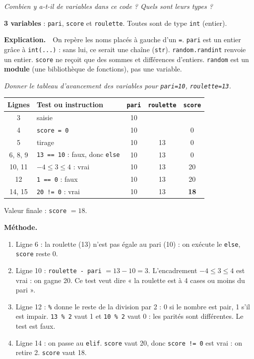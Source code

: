 \documentclass[addpoints, 11pt]{exam}
\newcommand{\enonce}[1]{\textit{#1}\par\smallskip}
\newcommand{\methode}{\par\smallskip\noindent\textbf{Méthode.}\ }
\newcommand{\explication}{\par\smallskip\noindent\textbf{Explication.}\ }
\newcommand{\code}[1]{\texttt{#1}}
\DeclareRobustCommand{\_}{\textunderscore\allowbreak}
\begin{document}
\begin{questions}
\question[1] \enonce{Combien y a-t-il de variables dans ce code ? Quels sont leurs types ?}
\begin{reponse}
\textbf{3 variables} : \code{pari}, \code{score} et \code{roulette}. Toutes sont de type \code{int} (entier).
\end{reponse}
\explication\ On repère les noms placés à gauche d'un \code{=}. \code{pari} est un entier grâce à \code{int(...)} : sans lui, ce serait une chaîne (\code{str}). \code{random.randint} renvoie un entier. \code{score} ne reçoit que des sommes et différences d'entiers. \code{random} est un \textbf{module} (une bibliothèque de fonctions), pas une variable.

\question[3] \enonce{Donner le tableau d'avancement des variables pour \code{pari=10}, \code{roulette=13}.}
\begin{reponse}
\begin{center}
\begin{tabular}{|c|l|c|c|c|}
\hline
Lignes & Test ou instruction & \code{pari} & \code{roulette} & \code{score} \\ \hline
3 & saisie & 10 & & \\
4 & \code{score = 0} & 10 & & 0 \\
5 & tirage & 10 & 13 & 0 \\
6, 8, 9 & \code{13 == 10} : faux, donc \code{else} & 10 & 13 & 0 \\
10, 11 & $-4 \le 3 \le 4$ : vrai & 10 & 13 & 20 \\
12 & \code{1 == 0} : faux & 10 & 13 & 20 \\
14, 15 & \code{20 != 0} : vrai & 10 & 13 & \textbf{18} \\ \hline
\end{tabular}
\end{center}
Valeur finale : \code{score} $= 18$.
\end{reponse}
\methode
\begin{enumerate}
  \item Ligne 6 : la roulette (13) n'est pas égale au pari (10) : on exécute le \code{else}, \code{score} reste 0.
  \item Ligne 10 : \code{roulette - pari} $= 13 - 10 = 3$. L'encadrement $-4 \le 3 \le 4$ est vrai : on gagne 20. Ce test veut dire « la roulette est à 4 cases ou moins du pari ».
  \item Ligne 12 : \code{\%} donne le reste de la division par 2 : 0 si le nombre est pair, 1 s'il est impair. \code{13 \% 2} vaut 1 et \code{10 \% 2} vaut 0 : les parités sont différentes. Le test est faux.
  \item Ligne 14 : on passe au \code{elif}. \code{score} vaut 20, donc \code{score != 0} est vrai : on retire 2. \code{score} vaut 18.
\end{enumerate}


\end{questions}
\end{document}
